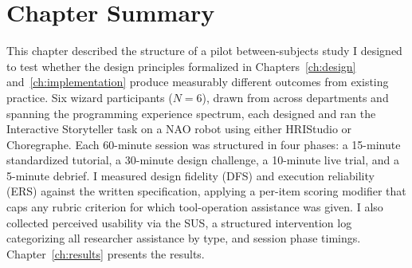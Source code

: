 \section{Chapter Summary}

This chapter described the structure of a pilot between-subjects study I designed to test whether the design principles formalized in Chapters~\ref{ch:design} and~\ref{ch:implementation} produce measurably different outcomes from existing practice. Six wizard participants ($N = 6$), drawn from across departments and spanning the programming experience spectrum, each designed and ran the Interactive Storyteller task on a NAO robot using either HRIStudio or Choregraphe. Each 60-minute session was structured in four phases: a 15-minute standardized tutorial, a 30-minute design challenge, a 10-minute live trial, and a 5-minute debrief. I measured design fidelity (DFS) and execution reliability (ERS) against the written specification, applying a per-item scoring modifier that caps any rubric criterion for which tool-operation assistance was given. I also collected perceived usability via the SUS, a structured intervention log categorizing all researcher assistance by type, and session phase timings. Chapter~\ref{ch:results} presents the results.
